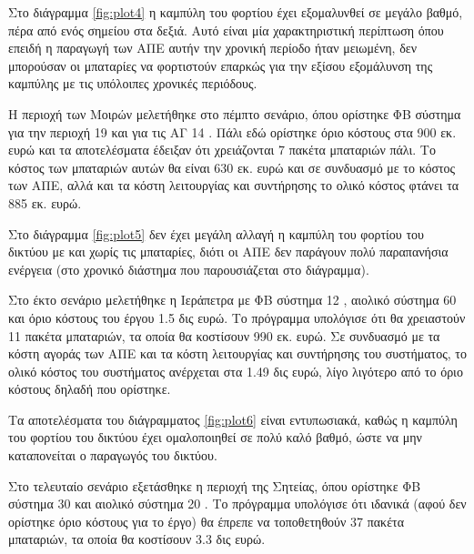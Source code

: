 \documentclass[12pt]{report}
\begin{document}
Στο διάγραμμα \ref{fig:plot4} η καμπύλη του φορτίου έχει εξομαλυνθεί σε μεγάλο βαθμό, πέρα από ενός σημείου στα δεξιά. Αυτό είναι μία χαρακτηριστική περίπτωση όπου επειδή η παραγωγή των ΑΠΕ αυτήν την χρονική περίοδο ήταν μειωμένη,
δεν μπορούσαν οι μπαταρίες να φορτιστούν επαρκώς για την εξίσου εξομάλυνση της καμπύλης με τις υπόλοιπες χρονικές περιόδους.

\begin{center}
\end{center}

Η περιοχή των Μοιρών μελετήθηκε στο πέμπτο σενάριο, όπου ορίστηκε ΦΒ σύστημα για την περιοχή 19 {} και για τις ΑΓ 14 {}. Πάλι εδώ ορίστηκε όριο κόστους στα 900 εκ. ευρώ και τα αποτελέσματα έδειξαν ότι
χρειάζονται 7 πακέτα μπαταριών πάλι. Το κόστος των μπαταριών αυτών θα είναι 630 εκ. ευρώ και σε συνδυασμό με το κόστος των ΑΠΕ, αλλά και τα κόστη λειτουργίας και συντήρησης το ολικό κόστος φτάνει τα 885 εκ. ευρώ.

Στο διάγραμμα \ref{fig:plot5} δεν έχει μεγάλη αλλαγή η καμπύλη του φορτίου του δικτύου με και χωρίς τις μπαταρίες, διότι οι ΑΠΕ δεν παράγουν πολύ παραπανήσια ενέργεια (στο χρονικό διάστημα που παρουσιάζεται στο διάγραμμα).

Στο έκτο σενάριο μελετήθηκε η Ιεράπετρα με ΦΒ σύστημα 12 {}, αιολικό σύστημα 60 {} και όριο κόστους του έργου 1.5 δις ευρώ. Το πρόγραμμα υπολόγισε ότι θα χρειαστούν 11 πακέτα μπαταριών, τα οποία θα
κοστίσουν 990 εκ. ευρώ. Σε συνδυασμό με τα κόστη αγοράς των ΑΠΕ και τα κόστη λειτουργίας και συντήρησης του συστήματος, το ολικό κόστος του συστήματος ανέρχεται στα 1.49 δις ευρώ, λίγο λιγότερο από το όριο κόστους δηλαδή που
ορίστηκε.

Τα αποτελέσματα του διάγραμματος \ref{fig:plot6} είναι εντυπωσιακά, καθώς η καμπύλη του φορτίου του δικτύου έχει ομαλοποιηθεί σε πολύ καλό βαθμό, ώστε να μην καταπονείται ο παραγωγός του δικτύου.

\begin{center}
\end{center}

Στο τελευταίο σενάριο εξετάσθηκε η περιοχή της Σητείας, όπου ορίστηκε ΦΒ σύστημα 30 {} και αιολικό σύστημα 20 {}. Το πρόγραμμα υπολόγισε ότι ιδανικά (αφού δεν ορίστηκε όριο κόστους για το έργο) θα 
έπρεπε να τοποθετηθούν 37 πακέτα μπαταριών, τα οποία θα κοστίσουν 3.3 δις ευρώ.
\end{document}
